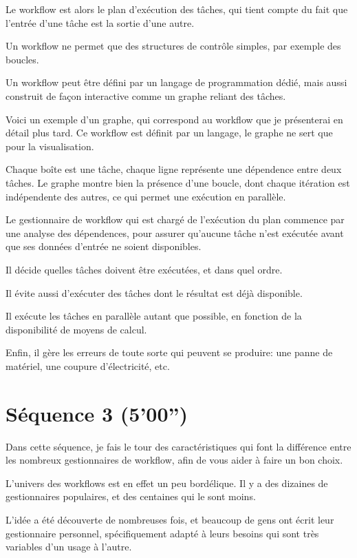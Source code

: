 \documentclass[12pt]{article}
\begin{document}
\newpage

Le workflow est alors le plan d'exécution des tâches, qui tient compte
du fait que l'entrée d'une tâche est la sortie d'une autre.

Un workflow ne permet que des structures de contrôle simples, par exemple
des boucles.

Un workflow peut être défini par un langage de programmation dédié,
mais aussi construit de façon interactive comme un graphe reliant des tâches.

\newpage

Voici un exemple d'un graphe, qui correspond au workflow que je
présenterai en détail plus tard. Ce workflow est définit par un langage,
le graphe ne sert que pour la visualisation.

Chaque boîte est une tâche, chaque ligne représente une dépendence
entre deux tâches. Le graphe montre bien la présence d'une boucle,
dont chaque itération est indépendente des autres, ce qui permet une
exécution en parallèle.

\newpage

Le gestionnaire de workflow qui est chargé de l'exécution du plan
commence par une analyse des dépendences, pour assurer qu'aucune tâche
n'est exécutée avant que ses données d'entrée ne soient disponibles.

Il décide quelles tâches doivent être exécutées, et dans quel ordre.

Il évite aussi d'exécuter des tâches dont le résultat est déjà disponible.

Il exécute les tâches en parallèle autant que possible, en fonction
de la disponibilité de moyens de calcul.

Enfin, il gère les erreurs de toute sorte qui peuvent se produire: une
panne de matériel, une coupure d'électricité, etc.

\newpage
\section*{Séquence 3 (5'00'')}

Dans cette séquence, je fais le tour des caractéristiques qui font la
différence entre les nombreux gestionnaires de workflow, afin de vous
aider à faire un bon choix.

\newpage

L'univers des workflows est en effet un peu bordélique. Il y a des
dizaines de gestionnaires populaires, et des centaines qui le sont
moins.

L'idée a été découverte de nombreuses fois, et beaucoup de gens ont
écrit leur gestionnaire personnel, spécifiquement adapté à leurs
besoins qui sont très variables d'un usage à l'autre.
\end{document}
